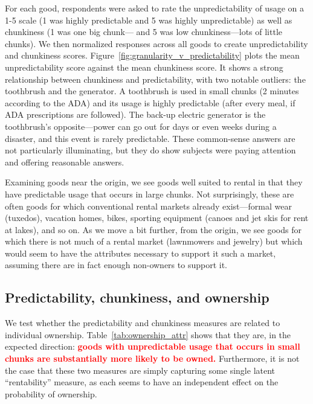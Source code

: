 \documentclass[11pt]{article}
\newcommand{\important}[1]{\textcolor{red}{\textbf{#1}}}
\newcommand{\important}[1]{#1}
\begin{document}
For each good, respondents were asked to rate the unpredictability of usage on a 1-5 scale (1 was highly predictable and 5 was highly unpredictable) as well as chunkiness (1 was one big chunk--- and 5 was low chunkiness---lots of little chunks).
We then normalized responses across all goods to create unpredictability and chunkiness scores. 
Figure~\ref{fig:granularity_v_predictability} plots the mean unpredictability score against the mean chunkiness score. 
It shows a strong relationship between chunkiness and predictability, with two notable outliers: the toothbrush and the generator. 
A toothbrush is used in small chunks (2 minutes according to the ADA) and its usage is highly predictable (after every meal, if ADA prescriptions are followed).
The back-up electric generator is the toothbrush's opposite---power can go out for days or even weeks during a disaster, and this event is rarely predictable. 
These common-sense answers are not particularly illuminating, but they do show subjects were paying attention and offering reasonable answers. 

Examining goods near the origin, we see goods well suited to rental in that they have predictable usage that occurs in large chunks. 
Not surprisingly, these are often goods for which conventional rental markets already exist---formal wear (tuxedos), vacation homes, bikes, sporting equipment (canoes and jet skis for rent at lakes), and so on.
As we move a bit further, from the origin, we see goods for which there is not much of a rental market (lawnmowers and jewelry) but which would seem to have the attributes necessary to support it such a market, assuming there are in fact enough non-owners to support it.  

\subsection{Predictability, chunkiness, and ownership} 
We test whether the predictability and chunkiness measures are related to individual ownership. 
Table~\ref{tab:ownership_attr} shows that they are, in the expected direction:
\important{goods with unpredictable usage that occurs in small chunks are substantially more likely to be owned.}
Furthermore, it is not the case that these two measures are simply capturing some single latent ``rentability'' measure, as each seems to have an independent effect on the probability of ownership. 

 
\end{document}
